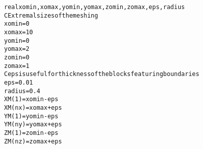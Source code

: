 \begin{alltt}
        real xomin,xomax,yomin,yomax,zomin,zomax,eps,radius
C       Extremal sizes of the meshing
        xomin=0
        xomax=10
        yomin=0
        yomax=2
        zomin=0
        zomax=1
C       eps is useful for thickness of the blocks featuring boundaries
        eps=0.01
        radius=0.4
        XM(1)=xomin-eps
        XM(nx)=xomax+eps
        YM(1)=yomin-eps
        YM(ny)=yomax+eps
        ZM(1)=zomin-eps
        ZM(nz)=zomax+eps
\end{alltt}
